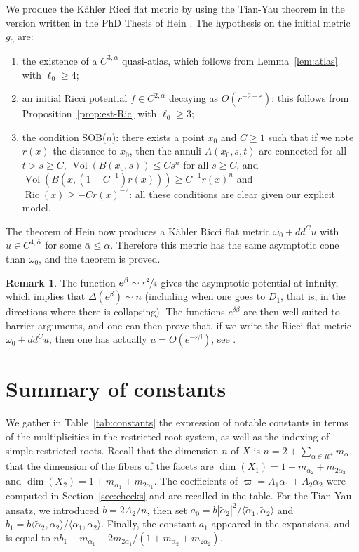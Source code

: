 \documentclass[10pt]{amsart}
\theoremstyle{plain}
\theoremstyle{definition}
\newtheorem{rem}[thm]{Remark}
\DeclareMathOperator{\Ric}{Ric}
\DeclareMathOperator{\Vol}{Vol}
\newcommand{\ta}{\tilde \alpha}
\newcommand{\rRoots}{R}
\begin{document}
We produce the Kähler Ricci flat metric by using the Tian-Yau theorem \cite{TiaYau91} in the version written in the PhD Thesis of Hein \cite[Prop.\,4.1]{Hei10}. The hypothesis on the initial metric $g_0$ are:
\begin{enumerate}
\item the existence of a $C^{3,\alpha}$ quasi-atlas, which follows from Lemma~\ref{lem:atlas} with $\ell_0\geq4$;
\item an initial Ricci potential $f\in C^{2,\alpha}$ decaying as $O(r^{-2-\varepsilon})$: this follows from Proposition~\ref{prop:est-Ric} with $\ell_0\geq 3$;
\item the condition SOB($n$): there exists a point $x_0$ and $C\geq 1$ such that if we note $r(x)$ the distance to $x_0$, then the annuli $A(x_0,s,t)$ are connected for all $t>s\geq C$, $\Vol(B(x_0,s))\leq Cs^n$ for all $s\geq C$, and $\Vol(B(x,(1-C^{-1})r(x))) \geq C^{-1} r(x)^n$ and $\Ric(x)\geq -Cr(x)^{-2}$: all these conditions are clear given our explicit model.
\end{enumerate}
The theorem of Hein now produces a Kähler Ricci flat metric $\omega_0+dd^Cu$ with $u\in C^{4,\bar \alpha}$ for some $\bar \alpha\leq \alpha$. Therefore this metric has the same asymptotic cone than $\omega_0$, and the theorem is proved.

\begin{rem}
The function $e^\beta\sim \sfrac{r^2}4$ gives the asymptotic potential at infinity, which implies that $\Delta(e^\beta) \sim n$ (including when one goes to $D_1$, that is, in the directions where there is collapsing). The functions $e^{\delta \beta}$ are then well suited to barrier arguments, and one can then prove that, if we write the Ricci flat metric $\omega_0+dd^Cu$, then one has actually $u=O(e^{-\varepsilon\beta})$, see \cite[\S4.5]{Hei10}.
\end{rem}

\section{Summary of constants}
\label{sec:summary-constants}
We gather in Table~\ref{tab:constants} the expression of notable constants in terms of the multiplicities
in the restricted root system, as well as the indexing of simple restricted roots.
Recall that the dimension $n$ of $X$ is $n=2+\sum_{\alpha\in\rRoots^+} m_{\alpha}$,
that the dimension of the fibers of the facets are
$\dim(X_1)=1+m_{\alpha_2}+m_{2\alpha_2}$ and
$\dim(X_2)=1+m_{\alpha_1}+m_{2\alpha_1}$.
The coefficients of $\varpi=A_1\alpha_1+A_2\alpha_2$ were computed in
Section~\ref{sec:checks} and are recalled in the table.
For the Tian-Yau ansatz, we introduced $b=2A_2/n$, then
set $a_0=b |\ta_2|^2/\langle \ta_1,\ta_2 \rangle$
and $b_1=b \langle \ta_2,\alpha_2\rangle / \langle \alpha_1,\alpha_2\rangle$.
Finally, the constant $a_1$ appeared in the expansions,
and is equal to
$nb_1-m_{\alpha_1}-2m_{2\alpha_1}/(1+m_{\alpha_2}+m_{2\alpha_2})$.
\end{document}

